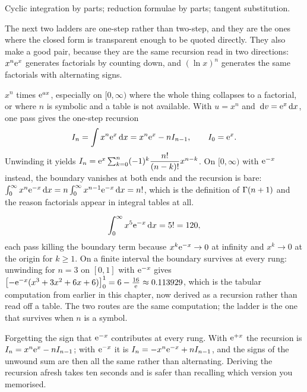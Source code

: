 \begin{seealsob}Cyclic integration by parts; reduction formulae by parts; tangent substitution.\end{seealsob}

The next two ladders are one-step rather than two-step, and they are the ones where the closed form is transparent enough to be quoted directly. They also make a good pair, because they are the same recursion read in two directions: $x^{n}\mathrm{e}^{x}$ generates factorials by counting down, and $(\ln x)^{n}$ generates the same factorials with alternating signs.

\cue $x^{n}$ times $\mathrm{e}^{ax}$, especially on $[0,\infty)$ where the whole thing collapses to a factorial, or where $n$ is symbolic and a table is not available.
\method With $u=x^{n}$ and $\,\mathrm{d} v=\mathrm{e}^{x}\,\mathrm{d} x$, one pass gives the one-step recursion
\[I_n=\int x^{n}\mathrm{e}^{x}\,\mathrm{d} x=x^{n}\mathrm{e}^{x}-nI_{n-1},\qquad I_0=\mathrm{e}^{x}.\]
Unwinding it yields $I_n=\mathrm{e}^{x}\sum_{k=0}^{n}(-1)^{k}\dfrac{n!}{(n-k)!}x^{n-k}$. On $[0,\infty)$ with $\mathrm{e}^{-x}$ instead, the boundary vanishes at both ends and the recursion is bare: $\int_0^{\infty}x^{n}\mathrm{e}^{-x}\,\mathrm{d} x=n\int_0^{\infty}x^{n-1}\mathrm{e}^{-x}\,\mathrm{d} x=n!$, which is the definition of $\Gamma(n+1)$ and the reason factorials appear in integral tables at all.

\begin{worked}
\[\int_0^{\infty}x^{5}\mathrm{e}^{-x}\,\mathrm{d} x=5!=120,\]
each pass killing the boundary term because $x^{k}\mathrm{e}^{-x}\to0$ at infinity and $x^{k}\to0$ at the origin for $k\geq1$. On a finite interval the boundary survives at every rung: unwinding for $n=3$ on $[0,1]$ with $\mathrm{e}^{-x}$ gives $\bigl[-\mathrm{e}^{-x}(x^{3}+3x^{2}+6x+6)\bigr]_0^1=6-\tfrac{16}{\mathrm{e}}\approx0.113929$, which is the tabular computation from earlier in this chapter, now derived as a recursion rather than read off a table. The two routes are the same computation; the ladder is the one that survives when $n$ is a symbol.
\end{worked}

\begin{trap}
Forgetting the sign that $\mathrm{e}^{-x}$ contributes at every rung. With $\mathrm{e}^{+x}$ the recursion is $I_n=x^{n}\mathrm{e}^{x}-nI_{n-1}$; with $\mathrm{e}^{-x}$ it is $I_n=-x^{n}\mathrm{e}^{-x}+nI_{n-1}$, and the signs of the unwound sum are then all the same rather than alternating. Deriving the recursion afresh takes ten seconds and is safer than recalling which version you memorised.
\end{trap}


